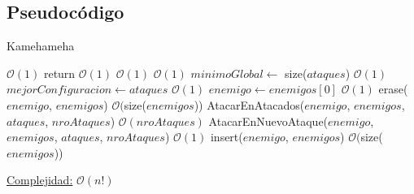 \documentclass[10pt,a4paper]{article}
\begin{document}
\subsection{Pseudocódigo}

\begin{algorithm}
\caption{Kamehameha}
\begin{algorithmic}
	 \Comment $\mathcal{O}(1)$
		\State return \Comment $\mathcal{O}(1)$
	\EndIf
	 \Comment $\mathcal{O}(1)$
		\Comment $\mathcal{O}(1)$
			\State $minimoGlobal \gets$ size($ataques$) \Comment $\mathcal{O}(1)$ 		
			\State $mejorConfiguracion \gets ataques$ \Comment $\mathcal{O}(1)$
		\EndIf
	\Else
		\State $enemigo \gets enemigos[0]$ \Comment $\mathcal{O}(1)$
		\State erase($enemigo$, $enemigos$) \Comment $\mathcal{O}($size($enemigos$))
		\State AtacarEnAtacados($enemigo$, $enemigos$, $ataques$, $nroAtaques$)	\Comment $\mathcal{O}(nroAtaques)$
		\State AtacarEnNuevoAtaque($enemigo$, $enemigos$, $ataques$, $nroAtaques$) \Comment $\mathcal{O}(1)$
		\State insert($enemigo$, $enemigos$) \Comment $\mathcal{O}($size($enemigos$))
\EndIf
\EndFunction
\end{algorithmic}
\underline{Complejidad:} $\mathcal{O}(n!)$\\
    
\end{algorithm}
\end{document}
